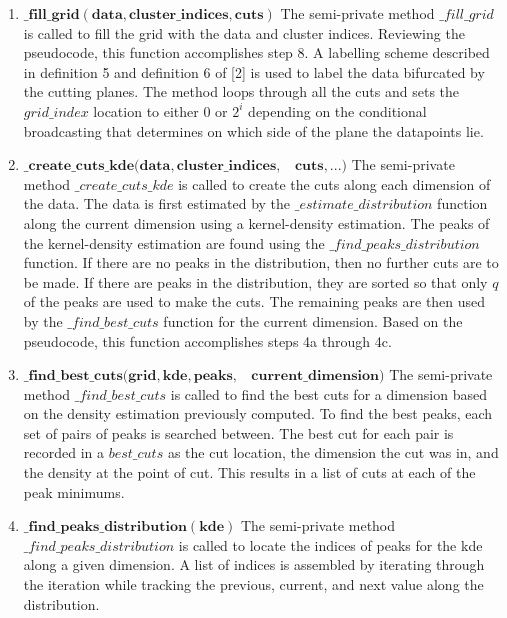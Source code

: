 \begin{enumerate}
    \item $\mathbf{\_fill\_grid(data, cluster\_indices,cuts)}$\newline
    {The semi-private method $\_fill\_grid$ is called to fill the grid with the data and cluster indices. Reviewing the pseudocode, this function accomplishes step 8. 
    A labelling scheme described in definition 5 and definition 6 of [2] is used to label the data bifurcated by the cutting planes. 
    The method loops through all the cuts and sets the $grid\_index$ location to either 0 or ${2^i}$ depending on the conditional broadcasting that determines on which side of the plane the datapoints lie.}
    \item $\mathbf{\_create\_cuts\_kde(data, cluster\_indices,}$\newline $\mathbf{~~~~cuts,  ... )}$\newline
    {The semi-private method $\_create\_cuts\_kde$ is called to create the cuts along each dimension of the data.
    The data is first estimated by the $\_estimate\_distribution$ function along the current dimension using a kernel-density estimation.
    The peaks of the kernel-density estimation are found using the $\_find\_peaks\_distribution$ function.
    If there are no peaks in the distribution, then no further cuts are to be made.
    If there are peaks in the distribution, they are sorted so that only $q$ of the peaks are used to make the cuts.
    The remaining peaks are then used by the $\_find\_best\_cuts$ function for the current dimension.
    Based on the pseudocode, this function accomplishes steps 4a through 4c.}
    \item $\mathbf{\_find\_best\_cuts(grid, kde, peaks, }$\newline $\mathbf{~~~~current\_dimension)}$\newline
    {The semi-private method $\_find\_best\_cuts$ is called to find the best cuts for a dimension based on the density estimation previously computed.
    To find the best peaks, each set of pairs of peaks is searched between. The best cut for each pair is recorded in a $best\_cuts$ as the cut location, the dimension the cut was in, and the density at the point of cut.
    This results in a list of cuts at each of the peak minimums.}
    \item $\mathbf{\_find\_peaks\_distribution(kde)}$\newline
    {The semi-private method $\_find\_peaks\_distribution$ is called to locate the indices of peaks for the kde along a given dimension.
    A list of indices is assembled by iterating through the iteration while tracking the previous, current, and next value along the distribution.
}
\end{enumerate}
